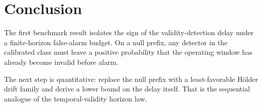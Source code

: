 \section{Conclusion}

The first benchmark result isolates the sign of the validity-detection delay
under a finite-horizon false-alarm budget. On a null prefix, any detector in the
calibrated class must leave a positive probability that the operating window has
already become invalid before alarm.

The next step is quantitative: replace the null prefix with a least-favorable
H\"older drift family and derive a lower bound on the delay itself. That is the
sequential analogue of the temporal-validity horizon law.
